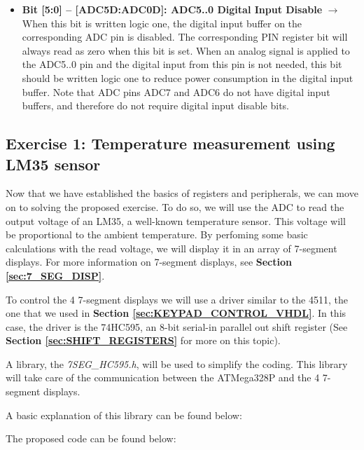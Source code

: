 \begin{itemize}
    \item \textbf{Bit [5:0] – [ADC5D:ADC0D]: ADC5..0 Digital Input Disable} $\bm{\rightarrow}$ When this bit is written logic one, the digital input buffer on the corresponding ADC pin is disabled. The corresponding PIN register bit will always read as zero when this bit is set. When an analog signal is applied to the ADC5..0 pin and the digital input from this pin is not needed, this bit should be written logic one to reduce power consumption in the digital input buffer. Note that ADC pins ADC7 and ADC6 do not have digital input buffers, and therefore do not require digital input disable bits.
\end{itemize}

\clearpage

\subsection{Exercise 1: Temperature measurement using LM35 sensor}

Now that we have established the basics of registers and peripherals, we can move on to solving the proposed exercise. To do so, we will use the ADC to read the output voltage of an LM35, a well-known temperature sensor. This voltage will be proportional to the ambient temperature. By perfoming some basic calculations with the read voltage, we will display it in an array of 7-segment displays. For more information on 7-segment displays, see \textbf{Section \ref{sec:7_SEG_DISP}}. \medskip

To control the 4 7-segment displays we will use a driver similar to the 4511, the one that we used in \textbf{Section \ref{sec:KEYPAD_CONTROL_VHDL}}. In this case, the driver is the 74HC595, an 8-bit serial-in parallel out shift register (See \textbf{Section \ref{sec:SHIFT_REGISTERS}} for more on this topic).\medskip

A library, the \textit{7SEG\_HC595.h}, will be used to simplify the coding. This library will take care of the communication between the ATMega328P and the 4 7-segment displays.\medskip

A basic explanation of this library can be found below:


The proposed code can be found below:


